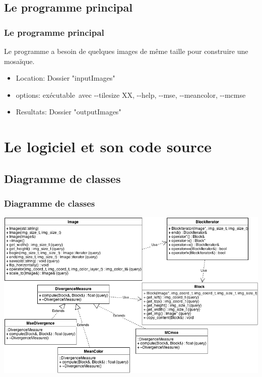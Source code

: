 \documentclass[handout]{beamer}
\newcommand{\tcb}{\color{blue}}
\begin{document}
\subsection{Le programme principal}

\begin{frame}
\frametitle{\bf Le programme principal}
Le programme a besoin de quelques images de m\^eme taille pour construire une mosa\"{i}que.
\begin{itemize}
\item {\tcb Location}: Dossier "inputImages"

\item {\tcb options}: ex\'ecutable\ avec {-}{-}tilesize XX, {-}{-}help, {-}{-}mse, {-}{-}meancolor, {-}{-}mcmse

\item {\tcb Resultats}: Dossier "outputImages"
\end{itemize}

\end{frame}

\section{Le logiciel et son code source}

\subsection{Diagramme de classes}

\begin{frame}

\frametitle{\bf Diagramme de classes}
\begin{center}
\includegraphics[width=\textwidth]{class_diagram.png}
\end{center}

\end{frame}
\end{document}
